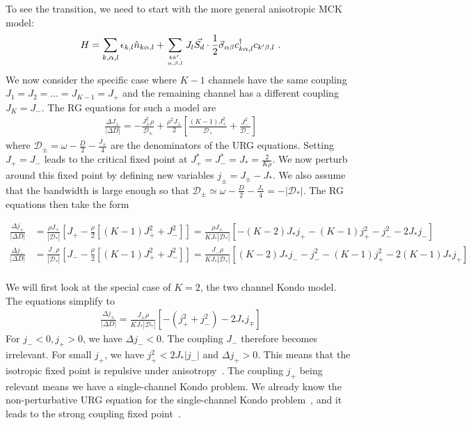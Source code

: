 \documentclass[reprint,prb,superscriptaddress]{revtex4-2}
\begin{document}
To see the transition, we need to start with the more general anisotropic MCK model:
\begin{align}
	H = \sum_{k,\alpha,l}\epsilon_{k,l} \hat n_{k\alpha,l} + \sum_{kk^\prime,\atop{\alpha,\beta,l}}J_l \vec{S_d}\cdot\frac{1}{2}\vec{\sigma}_{\alpha\beta}c_{k\alpha,l}^\dagger c_{k^\prime\beta, l}~.
\end{align}
We now consider the specific case where \(K-1\) channels have the same coupling \(J_1 = J_2 = ... = J_{K-1} = J_+\) and the remaining channel has a different coupling \(J_K = J_-\). The RG equations for such a model are
\begin{align}
	\frac{\Delta J_\pm}{|\Delta D|} = -\frac{J_\pm^2 \rho}{\mathcal{D}_\pm} + \frac{\rho^2 J_\pm}{2}\left[\frac{(K-1)J_+^2}{\mathcal{D}_+} + \frac{J_-^2}{\mathcal{D}_-}\right]
\end{align}
where \(\mathcal{D}_\pm = \omega - \frac{D}{2} - \frac{J_\pm}{4}\) are the denominators of the URG equations.
Setting \(J_+ = J_-\) leads to the critical fixed point at \(J_+^* = J_-^* = J_* = \frac{2}{K \rho}\). We now perturb around this fixed point by defining new variables \(j_\pm = J_\pm - J_*\). We also assume that the bandwidth is large enough so that \(\mathcal{D}_\pm \simeq \omega - \frac{D}{2} - \frac{J_*}{4} = -|\mathcal{D}_*|\). The RG equations then take the form
\begin{widetext}
\begin{align}
	\frac{\Delta j_+}{|\Delta D|} &= \frac{\rho J_+}{ |\mathcal{D}_*|}\left[J_+ - \frac{\rho}{2}\left[(K-1)J_+^2 + J_-^2\right]\right] = \frac{\rho J_+}{K J_*|\mathcal{D}_*|}\left[-\left(K - 2\right)J_*j_+ - (K-1)j_+^2 - j_-^2 - 2J_* j_-\right]\\
	\frac{\Delta j_-}{|\Delta D|} &= \frac{J_- \rho}{|\mathcal{D}_*|}\left[J_- - \frac{\rho}{2}\left[(K-1)J_+^2 + J_-^2\right]\right] = \frac{J_- \rho}{K J_*|\mathcal{D}_*|}\left[\left(K - 2\right)J_*j_-  - j_-^2 - (K-1)j_+^2 - 2(K-1)J_* j_+\right]\\
\end{align}
\end{widetext}
We will first look at the special case of \(K=2\), the two channel Kondo model. The equations simplify to
\begin{align}
	\frac{\Delta j_\pm}{|\Delta D|} = \frac{J_\pm \rho}{K J_*|\mathcal{D}_*|}\left[- \left(j_+^2 + j_-^2\right) - 2J_* j_\mp\right]
\end{align}
For \(j_- < 0, j_+ > 0\), we have \(\Delta j_- < 0\). The coupling \(J_-\) therefore becomes irrelevant. For small \(j_+\), we have \(j_+^2 < 2J_* |j_-|\)  and \(\Delta j_+ > 0\). This means that the isotropic fixed point is repulsive under anisotropy~\cite{Noz_blandin_1980}. The coupling \(j_+\) being relevant means we have a single-channel Kondo problem. We already know the non-perturbative URG equation for the single-channel Kondo problem~\cite{kondo_urg}, and it leads to the strong coupling fixed point~\cite{Noz_blandin_1980,fabrizio_nozieres_1995,mitchell_bulla_2014}.
\end{document}
